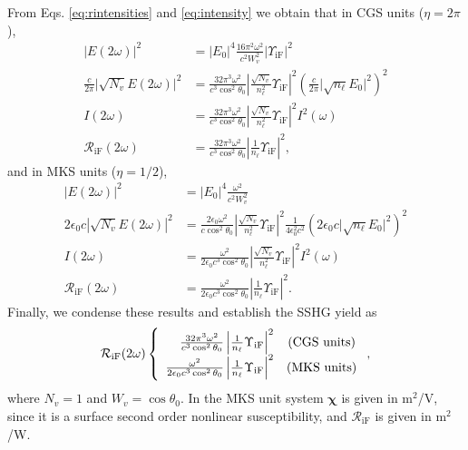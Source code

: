 From Eqs. \eqref{eq:rintensities} and \eqref{eq:intensity} we obtain that in
CGS units ($\eta=2\pi$), 
\begin{align}\label{eq:r01}
\vert E(2\omega)\vert^{2} &=
\vert E_{0}\vert^{4}\frac{16\pi^{2}\omega^{2}}{c^{2}W^2_{v}}
\vert\Upsilon_{\mathrm{iF}}\vert^{2}\nonumber\\
\frac{c}{2\pi}\vert\sqrt{N_{v}}E(2\omega)\vert^{2} &=
\frac{32\pi^{3}\omega^{2}}{c^{3}\cos^2\theta_{0}}
\left\vert\frac{\sqrt{N_{v}}}{n^{2}_{\ell}}\Upsilon_{\mathrm{iF}}\right\vert^{2} 
\left(\frac{c}{2\pi}\vert\sqrt{n_{\ell}}E_{0}\vert^{2}\right)^{2}\nonumber\\ 
I(2\omega) &=
\frac{32\pi^{3}\omega^{2}}{c^{3}\cos^2\theta_{0}}
\left\vert\frac{\sqrt{N_{v}}}{n^{2}_{\ell}}\Upsilon_{\mathrm{iF}}\right\vert^{2}
I^{2}(\omega)\nonumber\\
\mathcal{R}_{\mathrm{iF}}(2\omega) &=
\frac{32\pi^{3}\omega^{2}}{c^{3}\cos^2\theta_{0}}
\left\vert\frac{1}{n_{\ell}}\Upsilon_{\mathrm{iF}}\right\vert^{2},
\end{align} 
and in MKS units ($\eta=1/2$),
\begin{align}\label{r01m}
\vert E(2\omega)\vert^{2} &=
\vert E_{0}\vert^{4}\frac{\omega^{2}}{c^{2}W^{2}_{v}}\nonumber\\
2\epsilon_{0}c|\sqrt{N_{v}}E(2\omega)|^{2} &=
\frac{2\epsilon_{0}\omega^{2}}{c\cos^{2}\theta_{0}}
\left\vert\frac{\sqrt{N_{v}}}{n^{2}_{\ell}}\Upsilon_{\mathrm{iF}}\right\vert^{2} 
\frac{1}{4\epsilon^{2}_0c^{2}}
\left(2\epsilon_{0}c\vert\sqrt{n_{\ell}}E_{0}\vert^{2}\right)^{2}\nonumber\\
I(2\omega) &= 
\frac{\omega^{2}}{2\epsilon_{0}c^3\cos^{2}\theta_{0}}
\left\vert\frac{\sqrt{N_{v}}}{n^{2}_{\ell}}\Upsilon_{\mathrm{iF}}\right\vert^{2}
I^{2}(\omega)\nonumber\\
\mathcal{R}_{\mathrm{iF}}(2\omega) &=
\frac{\omega^{2}}{2\epsilon_{0}c^3\cos^{2}\theta_{0}}
\left\vert  \frac{1}{n_{\ell}}\Upsilon_{\mathrm{iF}}\right\vert^{2}.
\end{align}
Finally, we condense these results and establish the SSHG yield as
\begin{equation}\label{eq:mc6}
\mathcal{R}_{\mathrm{iF}}(2\omega) 
\left\{
\begin{array}{ r c } 
\frac{32\pi^{3}\omega^{2}}{c^{3}\cos^{2}\theta_{0}}
\left\vert\frac{1}{n_{\ell}}\Upsilon_{\mathrm{iF}}\right\vert^{2} 
& \text{(CGS units)} \\
\frac{\omega^{2}}{2\epsilon_{0}c^3\cos^{2}\theta_{0}}
\left\vert\frac{1}{n_{\ell}}\Upsilon_{\mathrm{iF}}\right\vert^{2} 
& \text{(MKS units)} 
\end{array}
\right.,
\end{equation}
where $N_{v}=1$ and $W_{v}=\cos\theta_{0}$. In the MKS unit system
$\boldsymbol{\chi}$ is given in m$^{2}$/V, since it is a surface second order
nonlinear susceptibility, and $\mathcal{R}_{\mathrm{iF}}$ is given in m$^2$/W.

